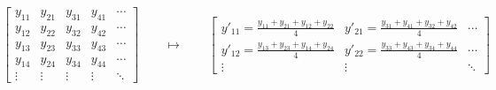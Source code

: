 \documentclass[10pt,preview]{standalone}
\begin{document}
%
\begin{equation*}%
  \begin{bmatrix}%
    y_{11} & y_{21} & y_{31} & y_{41} & \cdots \\
    y_{12} & y_{22} & y_{32} & y_{42} & \cdots \\
    y_{13} & y_{23} & y_{33} & y_{43} & \cdots \\
    y_{14} & y_{24} & y_{34} & y_{44} & \cdots \\
    \vdots & \vdots & \vdots & \vdots & \ddots
  \end{bmatrix}
  \qquad\mapsto\qquad
  \begin{bmatrix}
    y'_{11} = \frac{y_{11} + y_{21} + y_{12} + y_{22}}{4}
    & y'_{21} = \frac{y_{31} + y_{41} + y_{32} + y_{42}}{4}
    & \cdots \\
    y'_{12} = \frac{y_{13} + y_{23} + y_{14} + y_{24}}{4}
    & y'_{22} = \frac{y_{33} + y_{43} + y_{34} + y_{44}}{4}
    & \cdots \\
    \vdots  & \vdots  & \ddots
  \end{bmatrix}
\end{equation*}
\end{document}
